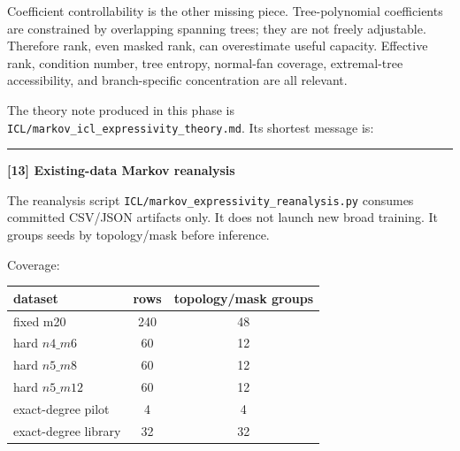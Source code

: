 \documentclass[11pt]{article}
\begin{document}
\vspace{0.5em}
\noindent Coefficient controllability is the other missing piece. Tree-polynomial coefficients are constrained by overlapping spanning trees; they are not freely adjustable. Therefore rank, even masked rank, can overestimate useful capacity. Effective rank, condition number, tree entropy, normal-fan coverage, extremal-tree accessibility, and branch-specific concentration are all relevant.

\vspace{0.5em}
\noindent The theory note produced in this phase is \texttt{ICL/markov\_icl\_expressivity\_theory.md}. Its shortest message is:
\begin{center}
\end{center}

\vspace{1em}
\noindent\rule{\textwidth}{0.4pt}
\vspace{1em}

\noindent\textbf{[13] Existing-data Markov reanalysis}

\vspace{0.5em}
\noindent The reanalysis script \texttt{ICL/markov\_expressivity\_reanalysis.py} consumes committed CSV/JSON artifacts only. It does not launch new broad training. It groups seeds by topology/mask before inference.

\vspace{0.5em}
\noindent Coverage:
\begin{center}
\begin{tabular}{lcc}
\toprule
dataset & rows & topology/mask groups\\
\midrule
fixed m20 & 240 & 48\\
hard $n4\_m6$ & 60 & 12\\
hard $n5\_m8$ & 60 & 12\\
hard $n5\_m12$ & 60 & 12\\
exact-degree pilot & 4 & 4\\
exact-degree library & 32 & 32\\
\bottomrule
\end{tabular}
\end{center}
\end{document}
